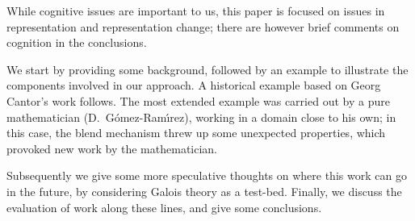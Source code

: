While cognitive issues are important to us, this paper
is focused on issues in representation and representation change;
there are however brief comments on cognition in the conclusions.

We start by providing some background, followed by an example to
illustrate the components involved in our approach. A historical
example based on Georg Cantor's work follows.  The most extended example was
carried out by a pure mathematician (D.\ G{\'o}mez-Ram{\'{\i}}rez), working in a
domain close to his own; in this case, the blend mechanism threw up
some unexpected properties, which provoked new work by the
mathematician.

Subsequently we give some more speculative thoughts on where this work
can go in the future, by considering Galois theory as a test-bed.
Finally, we discuss the evaluation of work along these lines, and
give some conclusions.

